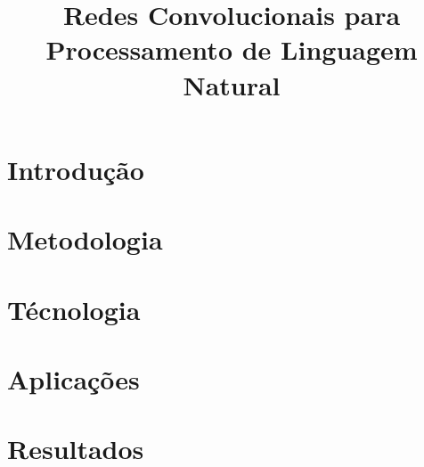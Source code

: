 \documentclass[a4paper,conference]{IEEEtran}
\begin{document}
%
\title{Redes Convolucionais para\\ Processamento de Linguagem Natural}


\author{
}


\maketitle

\begin{abstract}

\end{abstract}


\section{Introdução}


\section{Metodologia}


\section{Técnologia}


\section{Aplicações}


\section{Resultados}

\end{document}
